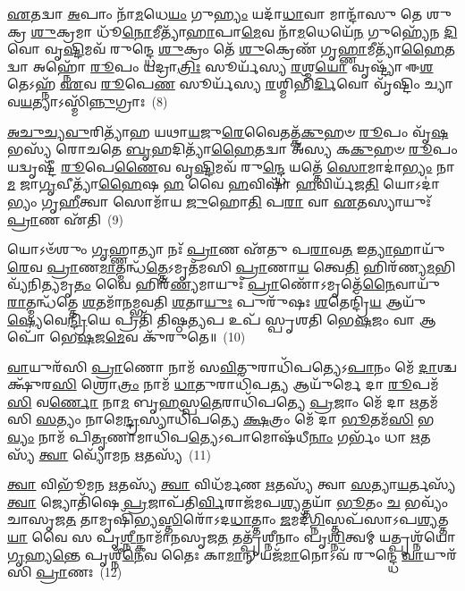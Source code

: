 {\anuvakamend[{𑌶𑌕𑍍𑌵᳴𑌰𑍀\-\ul{𑌷𑍍𑌵}\-𑌗𑍍𑌨𑍇𑌰𑍍𑌬𑍃\-\ul{𑌹}\-𑌸𑍍𑌪\-\ul{𑌤𑌿𑌃} 𑌪𑌞𑍍𑌚᳴𑌵𑌿𑍞𑌶𑌤𑌿𑌶𑍍𑌚}]}%

\-\ul{𑌏}\-𑌤𑌦𑍍𑌵𑌾 \ul{𑌅}\-𑌪𑌾𑌂 𑌨𑌾᳴\-\ul{𑌮}\-𑌧𑍇\-\ul{𑌯𑌂} 𑌗𑍁\-\ul{𑌹𑍍𑌯𑌂} 𑌯𑌦𑌾᳴\-\ul{𑌧𑌾}\-𑌵𑌾 𑌮𑌾𑌨𑍍𑌦𑌾᳴𑌸𑍁 𑌤𑍇 𑌶𑍁𑌕𑍍𑌰 \ul{𑌶𑍁}\-𑌕𑍍𑌰𑌮𑌾 𑌧𑍂᳴\-\ul{𑌨𑍋}\-𑌮𑍀𑌤𑍍𑌯𑌾᳴\-\ul{𑌹𑌾}\-𑌪𑌾\-\ul{𑌮𑍇}\-𑌵 𑌨𑌾᳴\-\ul{𑌮}\-𑌧𑍇𑌯𑍇᳴\-\ul{𑌨} 𑌗𑍁𑌹𑍍𑌯𑍇᳴𑌨 \ul{𑌦𑌿}\-𑌵𑍋 𑌵𑍃\-\ul{𑌷𑍍𑌟𑌿}\-𑌮𑌵᳴ 𑌰𑍁𑌨𑍍𑌦𑍍𑌧𑍇 \ul{𑌶𑍁}\-𑌕𑍍𑌰𑌂 𑌤𑍇᳴ \ul{𑌶𑍁}\-𑌕𑍍𑌰𑍇𑌣᳴ 𑌗𑍃\-\ul{𑌹𑍍𑌣𑌾}\-𑌮𑍀𑌤𑍍𑌯𑌾᳴\-\ul{𑌹𑍈}\-𑌤𑌦𑍍𑌵𑌾 𑌅𑌹𑍍𑌨𑍋᳴ \ul{𑌰𑍂}\-𑌪𑌂 𑌯𑌦𑍍𑌰𑌾\-\ul{𑌤𑍍𑌰𑌿𑌃} 𑌸𑍂𑌰𑍍𑌯᳴𑌸𑍍𑌯 \ul{𑌰}\-𑌶𑍍𑌮\-\ul{𑌯𑍋} 𑌵𑍃𑌷𑍍𑌟𑍍𑌯𑌾᳴ 𑌈\-\ul{𑌶}\-𑌤𑍇\-𑌽𑌹𑍍𑌨᳴ \ul{𑌏}\-𑌵 \ul{𑌰𑍂}\-𑌪𑍇\-\ul{𑌣} 𑌸𑍂𑌰𑍍𑌯᳴𑌸𑍍𑌯 \ul{𑌰}\-𑌶𑍍𑌮𑌿𑌭𑌿᳴\-\ul{𑌰𑍍𑌦𑌿}\-𑌵𑍋 𑌵𑍃᳴𑌷𑍍𑌟𑌿𑌂 𑌚𑍍𑌯𑌾𑌵\-\ul{𑌯}\-𑌤𑍍𑌯𑌾\-𑌽𑌸𑍍𑌮𑌿᳴\-\ul{𑌨𑍍𑌨𑍁}\-𑌗𑍍𑌰𑌾𑌃~(8)

\-\ul{𑌅}\-\-\ul{𑌚𑍁}\-\-\ul{𑌚𑍍𑌯}\-\-\ul{𑌵𑍁}\-𑌰𑌿𑌤𑍍𑌯𑌾᳴𑌹 𑌯𑌥𑌾\-\ul{𑌯}\-𑌜𑍁\-\ul{𑌰𑍇}\-𑌵𑍈𑌤𑌤𑍍𑌕᳴\-\ul{𑌕𑍁}\-𑌹𑍞 \ul{𑌰𑍂}\-𑌪𑌂 𑌵𑍃᳴\-\ul{𑌷}\-𑌭𑌸𑍍𑌯᳴ 𑌰𑍋𑌚𑌤𑍇 \ul{𑌬𑍃}\-𑌹𑌦𑌿𑌤𑍍𑌯𑌾᳴\-\ul{𑌹𑍈}\-𑌤𑌦𑍍𑌵𑌾 𑌅᳴𑌸𑍍𑌯 𑌕\-\ul{𑌕𑍁}\-𑌹𑍞 \ul{𑌰𑍂}\-𑌪𑌂 𑌯𑌦𑍍𑌵𑍃𑌷𑍍𑌟𑍀᳴ \ul{𑌰𑍂}\-𑌪𑍇\-\ul{𑌣𑍈}\-𑌵 𑌵𑍃\-\ul{𑌷𑍍𑌟𑌿}\-𑌮𑌵᳴ 𑌰𑍁\-\ul{𑌨𑍍𑌦𑍍𑌧𑍇} 𑌯𑌤𑍍𑌤𑍇᳴ \ul{𑌸𑍋}\-𑌮𑌾𑌦𑌾॑\-\ul{𑌭𑍍𑌯𑌂} 𑌨𑌾\-\ul{𑌮} 𑌜𑌾\-\ul{𑌗𑍃}\-𑌵𑍀𑌤𑍍𑌯𑌾᳴\-\ul{𑌹𑍈}\-𑌷 \ul{𑌹} 𑌵𑍈 \ul{𑌹}\-𑌵𑌿𑌷𑌾᳴ \ul{𑌹}\-𑌵𑌿𑌰𑍍𑌯᳴𑌜\-\ul{𑌤𑌿} 𑌯𑍋\-𑌽𑌦𑌾॑𑌭𑍍𑌯𑌂 𑌗𑍃\-\ul{𑌹𑍀}\-𑌤𑍍𑌵𑌾 𑌸𑍋𑌮𑌾᳴𑌯 \ul{𑌜𑍁}\-𑌹𑍋\-\ul{𑌤𑌿} 𑌪\-\ul{𑌰𑌾} 𑌵𑌾 \ul{𑌏}\-𑌤𑌸𑍍𑌯𑌾𑌯𑍁𑌃᳴ \ul{𑌪𑍍𑌰𑌾}\-𑌣 𑌏᳴𑌤𑌿~(9)

𑌯𑍋\-𑌽𑍞᳴𑌶𑍁𑌂 \ul{𑌗𑍃}\-𑌹𑍍𑌣𑌾𑌤𑍍𑌯𑌾 𑌨𑌃᳴ \ul{𑌪𑍍𑌰𑌾}\-𑌣 𑌏᳴𑌤𑍁 𑌪\-\ul{𑌰𑌾}\-𑌵\-\ul{𑌤} 𑌇\-\ul{𑌤𑍍𑌯𑌾}\-𑌹𑌾𑌯𑍁᳴\-\ul{𑌰𑍇}\-𑌵 \ul{𑌪𑍍𑌰𑌾}\-𑌣\-\ul{𑌮𑌾}\-𑌤𑍍𑌮𑌨𑍍𑌧᳴\-\ul{𑌤𑍍𑌤𑍇}\-\-𑌽𑌮𑍃𑌤᳴𑌮𑌸𑌿 \ul{𑌪𑍍𑌰𑌾}\-𑌣𑌾\-\ul{𑌯} 𑌤𑍍𑌵𑍇\-\ul{𑌤𑌿} 𑌹𑌿𑌰᳴𑌣𑍍𑌯\-\ul{𑌮}\-𑌭𑌿 𑌵𑍍𑌯᳴𑌨𑌿\-\ul{𑌤𑍍𑌯}\-𑌮𑍃\-\ul{𑌤𑌂} 𑌵𑍈 𑌹𑌿𑌰᳴\-\ul{𑌣𑍍𑌯}\-𑌮𑌾𑌯𑍁𑌃᳴ \ul{𑌪𑍍𑌰𑌾}\-𑌣𑍋᳴\-𑌽𑌮𑍃𑌤𑍇᳴\-\ul{𑌨𑍈}\-𑌵𑌾𑌯𑍁᳴\-\ul{𑌰𑌾}\-𑌤𑍍𑌮𑌨𑍍𑌧᳴𑌤𑍍𑌤𑍇 \ul{𑌶}\-𑌤𑌮𑌾᳴𑌨𑌮𑍍𑌭𑌵𑌤𑌿 \ul{𑌶}\-𑌤𑌾\-\ul{𑌯𑍁𑌃} 𑌪𑍁𑌰𑍁᳴𑌷𑌃 \ul{𑌶}\-𑌤𑍇𑌨𑍍𑌦𑍍𑌰𑌿᳴\-\ul{𑌯} 𑌆𑌯𑍁᳴\-\ul{𑌷𑍍𑌯𑍇}\-𑌵𑍇\-\ul{𑌨𑍍𑌦𑍍𑌰𑌿}\-𑌯𑍇 𑌪𑍍𑌰𑌤𑌿᳴ 𑌤𑌿𑌷𑍍𑌠\-\ul{𑌤𑍍𑌯}\-𑌪 𑌉𑌪᳴ 𑌸𑍍𑌪𑍃𑌶𑌤𑌿 𑌭𑍇\-\ul{𑌷}\-𑌜𑌂 𑌵𑌾 𑌆𑌪𑍋᳴ 𑌭𑍇\-\ul{𑌷}\-𑌜\-\ul{𑌮𑍇}\-𑌵 𑌕𑍁᳴𑌰𑍁𑌤𑍇॥~(10)

{\anuvakamend[{\-\ul{𑌉}\-𑌗𑍍𑌰𑌾 \ul{𑌏}\-𑌤𑍍𑌯𑌾\-\ul{𑌪}\-𑌸𑍍𑌤𑍍𑌰𑍀𑌣𑌿᳴ 𑌚}]}%

\-\ul{𑌵𑌾}\-𑌯𑍁𑌰᳴𑌸𑌿 \ul{𑌪𑍍𑌰𑌾}\-𑌣𑍋 𑌨𑌾𑌮᳴ 𑌸\-\ul{𑌵𑌿}\-𑌤𑍁𑌰𑌾𑌧𑌿᳴𑌪𑌤𑍍𑌯𑍇\-𑌽\-\ul{𑌪𑌾}\-𑌨𑌂 𑌮𑍇᳴ \ul{𑌦𑌾}\-𑌶𑍍𑌚𑌕𑍍𑌷𑍁᳴𑌰\-\ul{𑌸𑌿} 𑌶𑍍𑌰𑍋\-\ul{𑌤𑍍𑌰𑌂} 𑌨𑌾𑌮᳴ \ul{𑌧𑌾}\-𑌤𑍁𑌰𑌾𑌧𑌿᳴𑌪\-\ul{𑌤𑍍𑌯} 𑌆𑌯𑍁᳴𑌰𑍍𑌮𑍇 𑌦𑌾 \ul{𑌰𑍂}\-𑌪𑌮᳴\-\ul{𑌸𑌿} 𑌵\-\ul{𑌰𑍍𑌣𑍋} 𑌨𑌾\-\ul{𑌮} 𑌬𑍃\-\ul{𑌹}\-𑌸𑍍𑌪\-\ul{𑌤𑍇}\-𑌰𑌾𑌧𑌿᳴𑌪𑌤𑍍𑌯𑍇 \ul{𑌪𑍍𑌰}\-𑌜𑌾𑌂 𑌮𑍇᳴ 𑌦𑌾 \ul{𑌋}\-𑌤𑌮᳴𑌸𑌿 \ul{𑌸}\-𑌤𑍍𑌯𑌂 𑌨𑌾𑌮𑍇\-\ul{𑌨𑍍𑌦𑍍𑌰}\-𑌸𑍍𑌯𑌾𑌧𑌿᳴𑌪𑌤𑍍𑌯𑍇 \ul{𑌕𑍍𑌷}\-𑌤𑍍𑌰𑌂 𑌮𑍇᳴ 𑌦𑌾 \ul{𑌭𑍂}\-𑌤𑌮᳴\-\ul{𑌸𑌿} 𑌭\-\ul{𑌵𑍍𑌯𑌂} 𑌨𑌾𑌮᳴ 𑌪𑌿\-\ul{𑌤𑍃}\-𑌣𑌾𑌮𑌾𑌧𑌿᳴𑌪\-\ul{𑌤𑍍𑌯𑍇}\-\-𑌽𑌪𑌾𑌮𑍋𑌷᳴𑌧𑍀\-\ul{𑌨𑌾𑌂} 𑌗𑌰𑍍𑌭𑌂᳴ 𑌧𑌾 \ul{𑌋}\-𑌤𑌸𑍍𑌯᳴ \ul{𑌤𑍍𑌵𑌾} 𑌵𑍍𑌯𑍋᳴𑌮𑌨 \ul{𑌋}\-𑌤𑌸𑍍𑌯᳴~(11)

\-\ul{𑌤𑍍𑌵𑌾} 𑌵𑌿𑌭𑍂᳴𑌮𑌨 \ul{𑌋}\-𑌤𑌸𑍍𑌯᳴ \ul{𑌤𑍍𑌵𑌾} 𑌵𑌿𑌧᳴𑌰𑍍𑌮𑌣 \ul{𑌋}\-𑌤𑌸𑍍𑌯᳴ 𑌤𑍍𑌵𑌾 \ul{𑌸}\-𑌤𑍍𑌯𑌾\-\ul{𑌯}\-𑌰𑍍𑌤𑌸𑍍𑌯᳴ \ul{𑌤𑍍𑌵𑌾} 𑌜𑍍𑌯𑍋𑌤𑌿᳴𑌷𑍇 \ul{𑌪𑍍𑌰}\-𑌜𑌾𑌪᳴𑌤𑌿\-\ul{𑌰𑍍𑌵𑌿}\-𑌰𑌾𑌜᳴𑌮𑌪\-\ul{𑌶𑍍𑌯}\-𑌤𑍍𑌤𑌯𑌾᳴ \ul{𑌭𑍂}\-𑌤𑌂 \ul{𑌚} 𑌭𑌵𑍍𑌯𑌂᳴ 𑌚𑌾𑌸𑍃𑌜\-\ul{𑌤} 𑌤𑌾𑌮𑍃𑌷𑌿᳴𑌭𑍍𑌯\-\ul{𑌸𑍍𑌤𑌿}\-𑌰𑍋᳴\-𑌽𑌦\-\ul{𑌧𑌾}\-𑌤𑍍𑌤𑌾𑌂 \ul{𑌜}\-𑌮𑌦᳴\-\ul{𑌗𑍍𑌨𑌿}\-𑌸𑍍𑌤𑌪᳴𑌸𑌾\-𑌽𑌪\-\ul{𑌶𑍍𑌯}\-𑌤𑍍𑌤\-\ul{𑌯𑌾} 𑌵𑍈 𑌸 𑌪𑍃\-\ul{𑌶𑍍𑌨𑍀}\-𑌨𑍍𑌕𑌾𑌮𑌾᳴𑌨𑌸𑍃𑌜\-\ul{𑌤} 𑌤𑌤𑍍𑌪𑍃᳴𑌶𑍍𑌨𑍀𑌨𑌾𑌂 𑌪𑍃\-\ul{𑌶𑍍𑌨𑌿}\-𑌤𑍍𑌵𑌮𑍍 𑌯𑌤𑍍𑌪𑍃𑌶𑍍𑌨᳴𑌯𑍋 \ul{𑌗𑍃}\-𑌹𑍍𑌯\-\ul{𑌨𑍍𑌤𑍇} 𑌪𑍃𑌶𑍍𑌨𑍀᳴\-\ul{𑌨𑍇}\-𑌵 𑌤𑍈𑌃 𑌕𑌾\-\ul{𑌮𑌾}\-𑌨𑍍 𑌯𑌜᳴\-\ul{𑌮𑌾}\-𑌨𑍋\-𑌽𑌵᳴ 𑌰𑍁𑌨𑍍𑌦𑍍𑌧𑍇 \ul{𑌵𑌾}\-𑌯𑍁𑌰᳴𑌸𑌿 \ul{𑌪𑍍𑌰𑌾}\-𑌣𑌃~(12)

